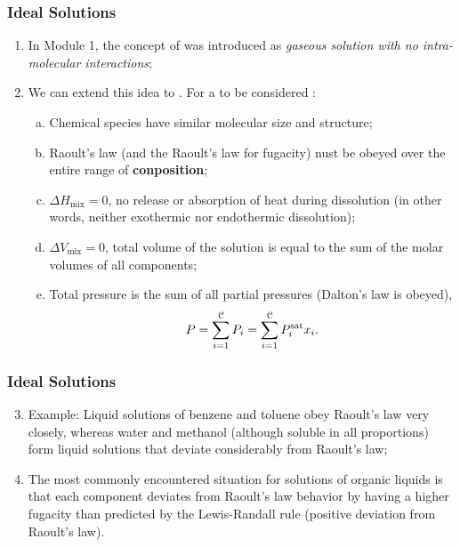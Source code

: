 \documentclass[10pt,compress,unknownkeysallowed]{beamer}
\begin{document}
\begin{frame}
  \frametitle{Ideal Solutions}
        \begin{enumerate}%
           \item<1-> In Module 1, the concept of  was introduced as {\it gaseous solution with no intra-molecular interactions};
           \item<2-> We can extend this idea to . For a   to be considered : 
             \begin{enumerate}[a)]
                \item<3-> Chemical species have similar molecular size and structure;
                \item<4-> Raoult's law (and the Raoult's law for fugacity) nust be obeyed over the entire range of {\bf conposition};
                \item<5-> $\Delta H_{\text{mix}}=0$, \ie no release or absorption of heat during dissolution (in other words, neither exothermic nor endothermic dissolution);
                \item<6-> $\Delta V_{\text{mix}}=0$, \ie total volume of the solution is equal to the sum of the molar volumes of all components;
                \item<7-> Total pressure is the sum of all partial pressures (\ie Dalton's law is obeyed), \ie
                  \begin{displaymath}
                    P = \summation[P_{i}]{i=1}{\mathcal{C}} = \summation[P_{i}^{\text{sat}}x_{i}]{i=1}{\mathcal{C}}.
                  \end{displaymath}
             \end{enumerate}  
        \end{enumerate}
\end{frame}
\normalsize

\begin{frame}
  \frametitle{Ideal Solutions}
        \begin{enumerate}\setcounter{enumi}{2}  
           \item<1-> Example: Liquid solutions of benzene and toluene obey Raoult's law very closely, whereas water and methanol (although soluble in all proportions) form liquid solutions that deviate considerably from Raoult's law;
           \item<2-> The most commonly encountered situation for solutions of organic liquids is that each component deviates from Raoult's law behavior by having a higher fugacity than predicted by the Lewis-Randall rule (\ie positive deviation from Raoult's law).    
        \end{enumerate}
\end{frame}
\normalsize
\end{document}
